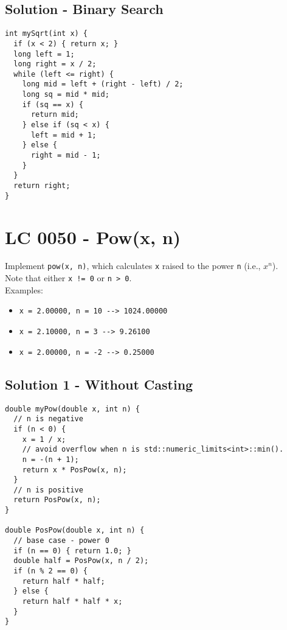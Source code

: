\subsection*{Solution - Binary Search}
\begin{lstlisting}
int mySqrt(int x) {
  if (x < 2) { return x; }
  long left = 1;
  long right = x / 2;
  while (left <= right) {
    long mid = left + (right - left) / 2;
    long sq = mid * mid;
    if (sq == x) {
      return mid;
    } else if (sq < x) {
      left = mid + 1;
    } else {
      right = mid - 1;
    }
  }
  return right;
}
\end{lstlisting}

\section{LC 0050 - Pow(x, n)}
Implement {\colorbox{CodeBackground}{\lstinline|pow(x, n)|}}, which calculates {\colorbox{CodeBackground}{\lstinline|x|}} raised to the power {\colorbox{CodeBackground}{\lstinline|n|}} (i.e., $x^n$).\\

Note that either {\colorbox{CodeBackground}{\lstinline|x != 0|}} or {\colorbox{CodeBackground}{\lstinline|n > 0|}}.\\

Examples:
\begin{itemize}
\item {\colorbox{CodeBackground}{\lstinline|x = 2.00000, n = 10 --> 1024.00000|}}
\item {\colorbox{CodeBackground}{\lstinline|x = 2.10000, n = 3 --> 9.26100|}}
\item {\colorbox{CodeBackground}{\lstinline|x = 2.00000, n = -2 --> 0.25000|}}
\end{itemize}


\subsection*{Solution 1 - Without Casting}
\begin{lstlisting}
double myPow(double x, int n) {
  // n is negative
  if (n < 0) {
    x = 1 / x;
    // avoid overflow when n is std::numeric_limits<int>::min().
    n = -(n + 1);
    return x * PosPow(x, n);
  }
  // n is positive
  return PosPow(x, n);
}

double PosPow(double x, int n) {
  // base case - power 0
  if (n == 0) { return 1.0; }
  double half = PosPow(x, n / 2);
  if (n % 2 == 0) {
    return half * half;
  } else {
    return half * half * x;
  }
}
\end{lstlisting}


